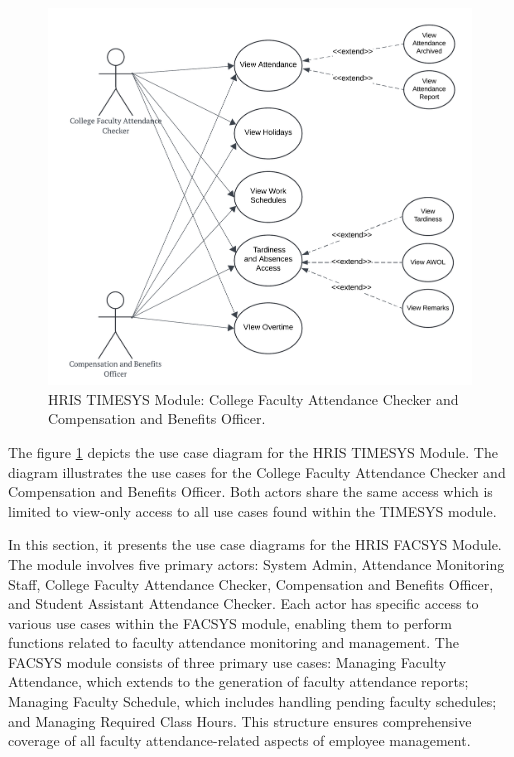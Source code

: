     \begin{figure}[H]
        \centering
        \includegraphics[width=0.9\linewidth]{figures/images/diagrams/usecase/use-case-time-2.png}
        \caption{HRIS TIMESYS Module: College Faculty Attendance Checker and Compensation and Benefits Officer.}
        \label{fig:use-case-time-2}
    \end{figure}

    The figure \ref{fig:use-case-time-2} depicts the use case diagram for the HRIS TIMESYS Module. The diagram illustrates the use cases for the College Faculty Attendance Checker and Compensation and Benefits Officer. Both actors share the same access which is limited to view-only access to all use cases found within the TIMESYS module. 


    In this section, it presents the use case diagrams for the HRIS FACSYS Module. The module involves five primary actors: System Admin, Attendance Monitoring Staff, College Faculty Attendance Checker, Compensation and Benefits Officer, and Student Assistant Attendance Checker. Each actor has specific access to various use cases within the FACSYS module, enabling them to perform functions related to faculty attendance monitoring and management. The FACSYS module consists of three primary use cases: Managing Faculty Attendance, which extends to the generation of faculty attendance reports; Managing Faculty Schedule, which includes handling pending faculty schedules; and Managing Required Class Hours. This structure ensures comprehensive coverage of all faculty attendance-related aspects of employee management.

